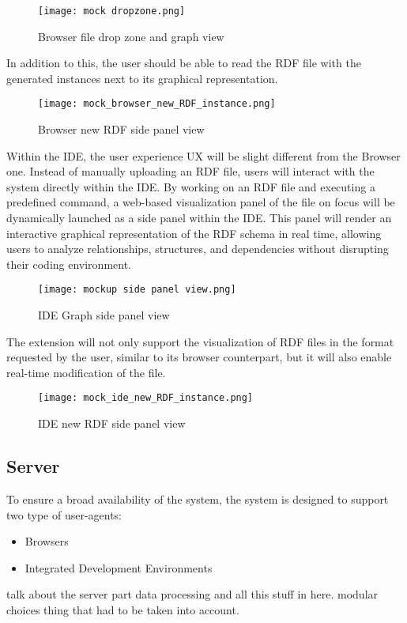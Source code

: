 \begin{figure}[H]
    \centering
    \texttt{[image: mock dropzone.png]}\\
    \caption{Browser file drop zone and graph view }\label{fig:BrowserGraphView}
  \end{figure}

In addition to this, the user should be able to read the RDF file with the generated instances next to its graphical representation.

\begin{figure}[H]
    \centering
    \texttt{[image: mock\_browser\_new\_RDF\_instance.png]}\\
    \caption{Browser new RDF side panel view }\label{fig:BrowserRDFReader}
  \end{figure}

Within the IDE, the user experience UX will be slight different from the Browser one. Instead of manually uploading an RDF file, users will interact with the system directly within the IDE. By working on an RDF file and executing a predefined command, a web-based visualization panel of the file on focus will be dynamically launched as a side panel within the IDE. This panel will render an interactive graphical representation of the RDF schema in real time, allowing users to analyze relationships, structures, and dependencies without disrupting their coding environment. 

\begin{figure}[H]
    \centering
    \texttt{[image: mockup side panel view.png]}\\
    \caption{IDE Graph side panel view}\label{fig:IDEGraphView}
  \end{figure}

  The extension will not only support the visualization of RDF files in the format requested by the user, similar to its browser counterpart, but it will also enable real-time modification of the file.

  \begin{figure}[H]
      \centering
      \texttt{[image: mock\_ide\_new\_RDF\_instance.png]}\\
      \caption{IDE new RDF side panel view}\label{fig:IDERDFReader}
    \end{figure}

  \subsection{Server\label{sec:server}}
  To ensure a broad availability of the system, the system is designed to support two type of user-agents:
  \begin{itemize}
      \item Browsers
      \item Integrated Development Environments 
  \end{itemize}
talk about the server part data processing and all this stuff in here.  modular choices thing that had to be taken into account.